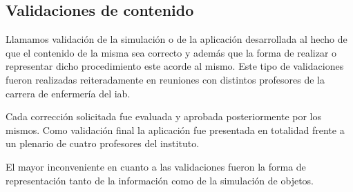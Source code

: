 
\subsection{Validaciones de contenido}

Llamamos validación de la simulación o de la aplicación desarrollada al hecho de
que el contenido de la misma sea correcto y además que la forma de realizar o
representar dicho procedimiento este acorde al mismo. Este tipo de validaciones
fueron realizadas reiteradamente en reuniones con distintos profesores de la
carrera de enfermería del \Gls{iab}.

Cada corrección solicitada fue evaluada y aprobada posteriormente por los
mismos. Como validación final la aplicación fue presentada en totalidad frente a
un plenario de cuatro profesores del instituto.

El mayor inconveniente en cuanto a las validaciones fueron la forma de
representación tanto de la información como de la simulación de objetos.
